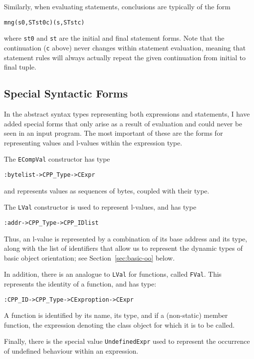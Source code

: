 \documentclass[11pt]{article}
\begin{document}
Similarly, when evaluating statements, conclusions are typically of
the form
\begin{alltt}
   mng (s0, ST st0 c) (s, ST st c)
\end{alltt}
where \texttt{st0} and \texttt{st} are the initial and final statement
forms.  Note that the continuation (\texttt{c} above) never changes
within statement evaluation, meaning that statement rules will always
actually repeat the given continuation from initial to final tuple.

\subsection{Special Syntactic Forms}
\label{sec:spec-synt-forms}

In the abstract syntax types representing both expressions and
statements, I have added special forms that only arise as a result of
evaluation and could never be seen in an input program.  The most
important of these are the forms for representing values and l-values
within the expression type.

The \texttt{ECompVal} constructor has type
\begin{alltt}
   : byte list -> CPP_Type -> CExpr
\end{alltt}
and represents values as sequences of bytes, coupled with their type.

The \texttt{LVal} constructor is used to represent l-values, and has
type
\begin{alltt}
   : addr -> CPP_Type -> CPP_ID list
\end{alltt}
Thus, an l-value is represented by a combination of its base address
and its type, along with the list of identifiers that allow us to
represent the dynamic types of basic object orientation; see
Section~\ref{sec:basic-oo} below.

In addition, there is an analogue to \texttt{LVal} for functions,
called \texttt{FVal}.  This represents the identity of a function, and
has type:
\begin{alltt}
   : CPP_ID -> CPP_Type -> CExpr option -> CExpr
\end{alltt}
A function is identified by its name, its type, and if a (non-static)
member function, the expression denoting the class object for which it
is to be called.

Finally, there is the special value \texttt{UndefinedExpr} used to
represent the occurrence of undefined behaviour within an expression.
\end{document}
